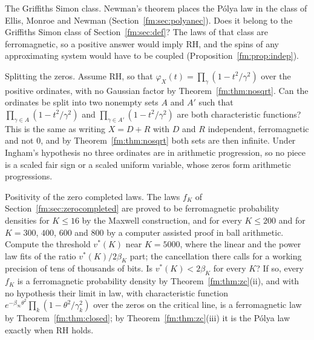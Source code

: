 \begin{problem}\label{fm:prob:gs}
The Griffiths Simon class. Newman's theorem places the P\'olya law in the class of Ellis, Monroe and Newman (Section~\ref{fm:sec:polyanec}). Does it belong to the Griffiths Simon class of Section~\ref{fm:sec:def}? The laws of that class are ferromagnetic, so a positive answer would imply RH, and the spins of any approximating system would have to be coupled (Proposition~\ref{fm:prop:indep}).
\end{problem}

\begin{problem}\label{fm:prob:split}
Splitting the zeros. Assume RH, so that $\varphi_X(t)=\prod_\gamma(1-t^2/\gamma^2)$ over the positive ordinates, with no Gaussian factor by Theorem~\ref{fm:thm:nosqrt}. Can the ordinates be split into two nonempty sets $A$ and $A'$ such that $\prod_{\gamma\in A}(1-t^2/\gamma^2)$ and $\prod_{\gamma\in A'}(1-t^2/\gamma^2)$ are both characteristic functions? This is the same as writing $X=D+R$ with $D$ and $R$ independent, ferromagnetic and not $0$, and by Theorem~\ref{fm:thm:nosqrt} both sets are then infinite. Under Ingham's hypothesis no three ordinates are in arithmetic progression, so no piece is a scaled fair sign or a scaled uniform variable, whose zeros form arithmetic progressions.
\end{problem}

\begin{problem}\label{fm:prob:zc}
Positivity of the zero completed laws. The laws $f_K$ of Section~\ref{fm:sec:zerocompleted} are proved to be ferromagnetic probability densities for $K\le16$ by the Maxwell construction, and for every $K\le200$ and for $K=300$, $400$, $600$ and $800$ by a computer assisted proof in ball arithmetic. Compute the threshold $v^*(K)$ near $K=5000$, where the linear and the power law fits of the ratio $v^*(K)/2\beta_K$ part; the cancellation there calls for a working precision of tens of thousands of bits. Is $v^*(K)<2\beta_K$ for every $K$? If so, every $f_K$ is a ferromagnetic probability density by Theorem~\ref{fm:thm:zc}(ii), and with no hypothesis their limit in law, with characteristic function $e^{-\beta_\infty\theta^2}\prod_k(1-\theta^2/\gamma_k^2)$ over the zeros on the critical line, is a ferromagnetic law by Theorem~\ref{fm:thm:closed}; by Theorem~\ref{fm:thm:zc}(iii) it is the P\'olya law exactly when RH holds.
\end{problem}

